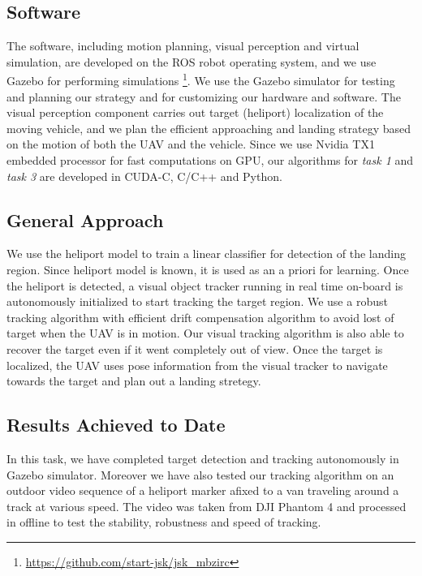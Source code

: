 \documentclass{standalone}
\begin{document}
\subsection{Software}

The software, including motion planning, visual perception and virtual simulation, are developed on the ROS robot operating system, and we use Gazebo for performing simulations \footnote{\url{https://github.com/start-jsk/jsk_mbzirc}}. We use the Gazebo simulator for testing and planning our strategy and for customizing our hardware and software. The visual perception component carries out target (heliport) localization of the moving vehicle, and we plan the efficient approaching and landing strategy based on the motion of both the UAV and the vehicle. Since we use Nvidia TX1 embedded processor for fast computations on GPU, our algorithms for \textit{task 1} and \textit{task 3} are developed in CUDA-C, C/C++ and Python. 



\subsection{General Approach}

We use the heliport model to train a linear classifier for detection of the landing region. Since heliport model is known, it is used as an a priori for learning. Once the heliport is detected, a visual object tracker running in real time on-board is autonomously initialized to start tracking the target region. We use a robust tracking algorithm with efficient drift compensation algorithm to avoid lost of target when the UAV is in motion. Our visual tracking algorithm is also able to recover the target even if it went completely out of view. Once the target is localized, the UAV uses pose information from the visual tracker to navigate towards the target and plan out a landing stretegy.

\subsection{Results Achieved to Date}
In this task, we have completed target detection and tracking autonomously in Gazebo simulator. 
Moreover we have also tested our tracking algorithm on an outdoor video sequence of a heliport marker afixed to a van traveling around a track at various speed. The video was taken from DJI Phantom 4 and processed in offline to test the stability, robustness and speed of tracking.
\end{document}
